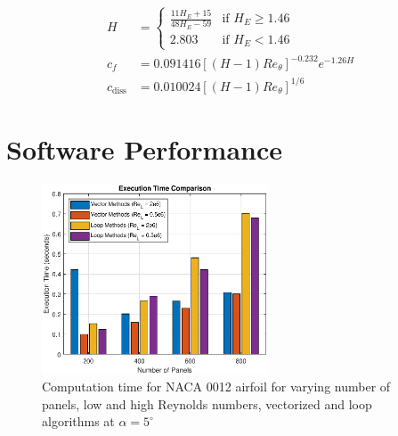 \documentclass{article}
\begin{document}
\begin{align}
    H &= \begin{cases}
        \frac{11 H_E + 15}{48H_E - 59} & \text{if } H_E  \ge 1.46 \\
        2.803 & \text{if } H_E < 1.46
    \end{cases} \\
    c_f &= 0.091416\left[(H-1)Re_\theta \right]^{-0.232}e^{-1.26H} \\
    c_\text{diss} &= 0.010024\left[(H-1)Re_\theta \right]^{1/6}
\end{align}

\section{Software Performance}

\begin{figure}[H]
    \centering
    \includegraphics[width=0.6\textwidth]{figures/RePanelVec_times.eps}
    \caption{Computation time for NACA 0012 airfoil for varying number of panels, low and high Reynolds numbers, vectorized and loop algorithms at $\alpha = 5^\circ$}
    \label{fig:airfoil}
\end{figure}
\end{document}
